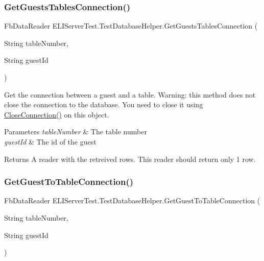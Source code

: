 \subsubsection{\texorpdfstring{Get\+Guests\+Tables\+Connection()}{GetGuestsTablesConnection()}}
{\footnotesize\ttfamily Fb\+Data\+Reader E\+L\+I\+Server\+Test.\+Test\+Database\+Helper.\+Get\+Guests\+Tables\+Connection (\begin{DoxyParamCaption}\item[{String}]{table\+Number,  }\item[{String}]{guest\+Id }\end{DoxyParamCaption})\hspace{0.3cm}{\ttfamily [inline]}}



Get the connection between a guest and a table. Warning\+: this method does not close the connection to the database. You need to close it using \hyperlink{class_e_l_i_server_test_1_1_test_database_helper_ae1ec2aaa4d83ed9f63a02844ec32600e}{Close\+Connection()} on this object. 


\begin{DoxyParams}{Parameters}
{\em table\+Number} & The table number\\
\hline
{\em guest\+Id} & The id of the guest\\
\hline
\end{DoxyParams}
\begin{DoxyReturn}{Returns}
A reader with the retreived rows. This reader should return only 1 row.
\end{DoxyReturn}
\mbox{\label{class_e_l_i_server_test_1_1_test_database_helper_aed83bc14862f6b5b0ecc61ffb9ad89bd}} 
\subsubsection{\texorpdfstring{Get\+Guest\+To\+Table\+Connection()}{GetGuestToTableConnection()}}
{\footnotesize\ttfamily Fb\+Data\+Reader E\+L\+I\+Server\+Test.\+Test\+Database\+Helper.\+Get\+Guest\+To\+Table\+Connection (\begin{DoxyParamCaption}\item[{String}]{table\+Number,  }\item[{String}]{guest\+Id }\end{DoxyParamCaption})\hspace{0.3cm}{\ttfamily [inline]}}



